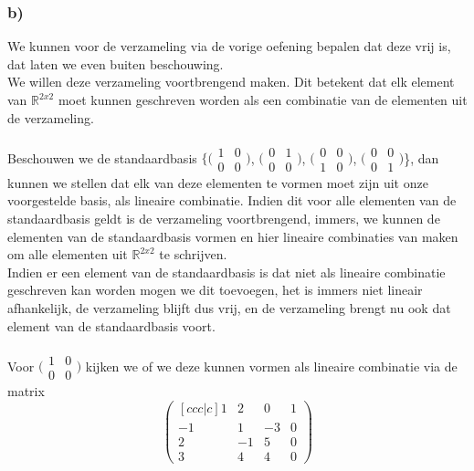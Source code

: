 \documentclass[lineaire_algebra_oplossingen.tex]{subfiles}
\begin{document}
\subsubsection*{b)}
We kunnen voor de verzameling via de vorige oefening bepalen dat deze vrij is, dat laten we even buiten beschouwing.\\
We willen deze verzameling voortbrengend maken. Dit betekent dat elk element van $\mathbb{R}^{2x2}$ moet kunnen geschreven worden als een combinatie van de elementen uit de verzameling.\\\\
Beschouwen we de standaardbasis $\{\bigl(
\begin{smallmatrix}
1&0\\ 0&0
\end{smallmatrix}
\bigr)$,
$\bigl(
\begin{smallmatrix}
0&1\\ 0&0
\end{smallmatrix}
\bigr)$,
$\bigl(
\begin{smallmatrix}
0&0\\ 1&0
\end{smallmatrix}
\bigr)$,
$\bigl(
\begin{smallmatrix}
0&0\\ 0&1
\end{smallmatrix}
\bigr)$\}, dan kunnen we stellen dat elk van deze elementen te vormen moet zijn uit onze voorgestelde basis, als lineaire combinatie. Indien dit voor alle elementen van de standaardbasis geldt is de verzameling voortbrengend, immers, we kunnen de elementen van de standaardbasis vormen en hier lineaire combinaties van maken om alle elementen uit $\mathbb{R}^{2x2}$ te schrijven.\\
Indien er een element van de standaardbasis is dat niet als lineaire combinatie geschreven kan worden mogen we dit toevoegen, het is immers niet lineair afhankelijk, de verzameling blijft dus vrij, en de verzameling brengt nu ook dat element van de standaardbasis voort.\\\\
Voor $\bigl(
\begin{smallmatrix}
1&0\\ 0&0
\end{smallmatrix}
\bigr)$ kijken we of we deze kunnen vormen als lineaire combinatie via de matrix
\[
\begin{pmatrix}[ccc|c]
1 & 2 & 0 & 1\\
-1 & 1 & -3 & 0\\
2 & -1 & 5 & 0\\
3 & 4 & 4 & 0
\end{pmatrix}
\]
\end{document}
